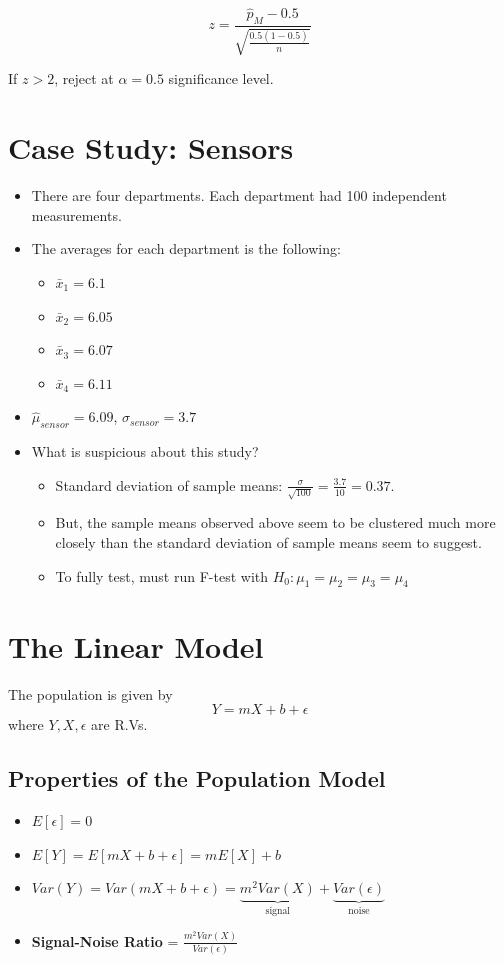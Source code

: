 \documentclass{article}
\begin{document}
\[
    z = \frac{\hat{p}_{M} - 0.5}{\sqrt{\frac{0.5(1-0.5)}{n}}}
\]

If $z > 2$, reject at $\alpha = 0.5$ significance level.

\section{Case Study: Sensors}
\begin{itemize}
    \item There are four departments. Each department had 100 independent measurements.
    \item The averages for each department is the following:
    \begin{itemize}
        \item $\bar{x}_1 = 6.1$
        \item $\bar{x}_2 = 6.05$
        \item $\bar{x}_3 = 6.07$
        \item $\bar{x}_4 = 6.11$
    \end{itemize}
    \item $\hat{\mu}_{sensor} = 6.09$, $\sigma_{sensor} = 3.7$
    \item What is suspicious about this study?
    \begin{itemize}
        \item Standard deviation of sample means: $\frac{\sigma}{\sqrt{100}} = \frac{3.7}{10} = 0.37$. 
        \item But, the sample means observed above seem to be clustered much more closely than the standard deviation of sample means seem to suggest.
        \item To fully test, must run F-test with $H_0: \mu_1 = \mu_2 = \mu_3 = \mu_4$
    \end{itemize}
\end{itemize}

\section{The Linear Model}
The population is given by
\[
    Y = mX + b + \epsilon
\]
where $Y, X, \epsilon$ are R.Vs.

\subsection{Properties of the Population Model}
\begin{itemize}
    \item $E[\epsilon] = 0$
    \item $E[Y] = E[mX + b + \epsilon] = mE[X] + b$
    \item $Var(Y) = Var(mX + b + \epsilon) = \underbrace{m^2Var(X)}_{\text{signal}} + \underbrace{Var(\epsilon)}_{\text{noise}}$
    \item \textbf{Signal-Noise Ratio} = $\frac{m^2Var(X)}{Var(\epsilon)}$
\end{itemize}
\end{document}
